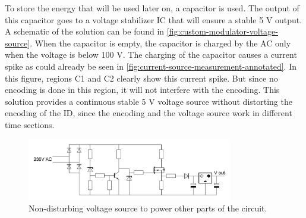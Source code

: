	To store the energy that will be used later on, a capacitor is used.
	The output of this capacitor goes to a voltage stabilizer IC that will ensure a stable 5 V output.
	A schematic of the solution can be found in \autoref{fig:custom-modulator-voltage-source}.
	When the capacitor is empty, the capacitor is charged by the AC only when the voltage is below 100 V.
	The charging of the capacitor causes a current spike as could already be seen in \autoref{fig:current-source-measurement-annotated}.
	In this figure, regions C1 and C2 clearly show this current spike.
	But since no encoding is done in this region, it will not interfere with the encoding.
	This solution provides a continuous stable 5 V voltage source without distorting the encoding of the ID, since the encoding and the voltage source work in different time sections.

	\begin{figure}[h]
		\centering
		\includegraphics[angle=0,width=0.8\textwidth]{chapters/hardware-chapters/AC/ac-modulator/custom-hardware/ac-voltage-source/custom-modulator-voltage-source.JPG}
		\caption{Non-disturbing voltage source to power other parts of the circuit.}
		\label{fig:custom-modulator-voltage-source}
	\end{figure}
	

